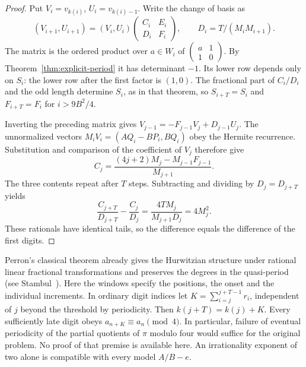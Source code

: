 \documentclass[11pt]{amsart}
\theoremstyle{definition}
\theoremstyle{remark}
\numberwithin{equation}{section}
\begin{document}
\begin{proof}
Put $V_i=v_{k(i)}$, $U_i=v_{k(i)-1}$. Write the change of basis as
\[
 (V_{i+1},U_{i+1})=(V_i,U_i)
 \begin{pmatrix} C_i&E_i\\D_i&F_i\end{pmatrix},
 \qquad D_i=T/(M_iM_{i+1}).
\]
The matrix is the ordered product over $a\in W_i$ of
$\left(\begin{smallmatrix}a&1\\1&0\end{smallmatrix}\right)$.
By Theorem~\ref{thm:explicit-period} it has determinant $-1$.
Its lower row depends only on $S_i$: the lower row after the first
factor is $(1,0)$. The fractional part of $C_i/D_i$ and the odd
length determine $S_i$, as in that theorem, so
$S_{i+T}=S_i$ and $F_{i+T}=F_i$ for $i>9B^2/4$.


Inverting the preceding matrix gives $V_{j-1}=-F_{j-1}V_j+D_{j-1}U_j$.
The unnormalized vectors $M_iV_i=(AQ_i-BP_i,BQ_i)$ obey the Hermite
recurrence. Substitution and comparison of the coefficient of $V_j$
therefore give
\[
 C_j=\frac{(4j+2)M_j-M_{j-1}F_{j-1}}{M_{j+1}} .
\]
The three contents repeat after $T$ steps. Subtracting and dividing by
$D_j=D_{j+T}$ yields
\[
 \frac{C_{j+T}}{D_{j+T}}-\frac{C_j}{D_j}
 =\frac{4T M_j}{M_{j+1}D_j}=4M_j^2 .
\]
These rationals have identical tails, so the difference equals the
difference of the first digits.
\end{proof}

Perron's classical theorem already gives the Hurwitzian structure under
rational linear fractional transformations and preserves the degrees
in the quasi-period (see Stambul~\cite[p.~141]{Stambul}). Here the
windows specify the positions, the onset and the individual increments.
In ordinary digit indices let $K=\sum_{i=j}^{j+T-1}r_i$, independent
of $j$ beyond the threshold by periodicity. Then $k(j+T)=k(j)+K$.
Every sufficiently late digit obeys $a_{n+K}\equiv a_n\pmod4$.
In particular, failure of eventual periodicity of the partial quotients
of $\pi$ modulo four would suffice for the original problem.
No proof of that premise is available here. An irrationality exponent
of two alone is compatible with every model $A/B-e$.
\end{document}
